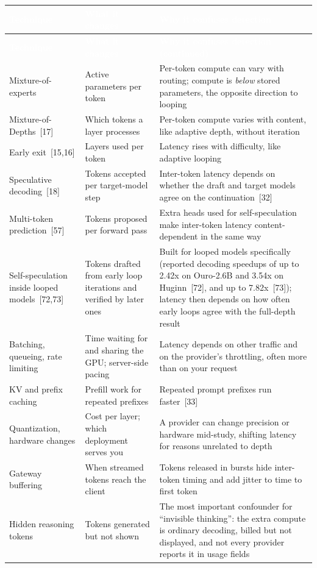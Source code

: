 \documentclass[11pt,letterpaper]{article}
\newcommand{\hd}[1]{\textcolor{white}{\bfseries #1}}
\newcommand{\tablefinish}{\arrayrulecolor{deepindigo}\specialrule{0.8pt}{0pt}{0pt}\arrayrulecolor{black}}
\newcommand{\zebra}{\rowcolors{2}{white}{paleindigo!75}}
\begin{document}
{\footnotesize
\zebra
\begin{longtable}{L{3.0cm} L{3.6cm} L{9.35cm}}
\hd{Technique} & \hd{What it changes} & \hd{Why it confuses detection} \\
\endfirsthead
{}
\hd{Technique} & \hd{What it changes} & \hd{Why it confuses detection (continued)} \\
\endhead
\tablefinish
\endlastfoot
Mixture-of-experts & Active parameters per token & Per-token compute can vary with routing; compute is \emph{below} stored parameters, the opposite direction to looping \\
Mixture-of-Depths~[17] & Which tokens a layer processes & Per-token compute varies with content, like adaptive depth, without iteration \\
Early exit~[15,16] & Layers used per token & Latency rises with difficulty, like adaptive looping \\
Speculative decoding~[18] & Tokens accepted per target-model step & Inter-token latency depends on whether the draft and target models agree on the continuation~[32] \\
Multi-token prediction~[57] & Tokens proposed per forward pass & Extra heads used for self-speculation make inter-token latency content-dependent in the same way \\
Self-speculation inside looped models~[72,73] & Tokens drafted from early loop iterations and verified by later ones & Built for looped models specifically (reported decoding speedups of up to 2.42x on Ouro-2.6B and 3.54x on Huginn~[72], and up to 7.82x~[73]); latency then depends on how often early loops agree with the full-depth result \\
Batching, queueing, rate limiting & Time waiting for and sharing the GPU; server-side pacing & Latency depends on other traffic and on the provider's throttling, often more than on your request \\
KV and prefix caching & Prefill work for repeated prefixes & Repeated prompt prefixes run faster~[33] \\
Quantization, hardware changes & Cost per layer; which deployment serves you & A provider can change precision or hardware mid-study, shifting latency for reasons unrelated to depth \\
Gateway buffering & When streamed tokens reach the client & Tokens released in bursts hide inter-token timing and add jitter to time to first token \\
Hidden reasoning tokens & Tokens generated but not shown & The most important confounder for ``invisible thinking'': the extra compute is ordinary decoding, billed but not displayed, and not every provider reports it in usage fields \\
\end{longtable}
}
\end{document}
